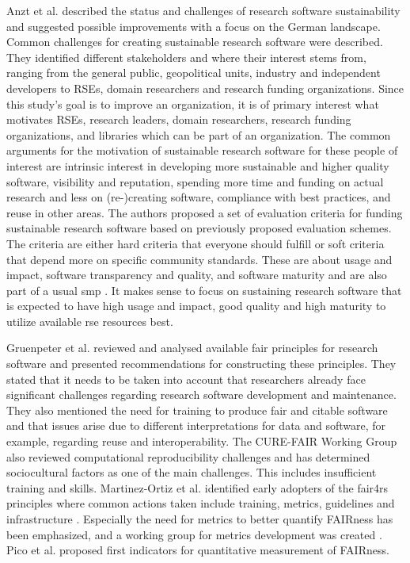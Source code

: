 Anzt et al. \cite{anzt_environment_2021} described the status and challenges of research software sustainability and suggested possible improvements with a focus on the German landscape. Common challenges for creating sustainable research software were described. 
They identified different stakeholders and where their interest stems from, ranging from the general public, geopolitical units, industry and independent developers to RSEs, domain researchers and research funding organizations. Since this study's goal is to improve an organization, it is of primary interest what motivates RSEs, research leaders, domain researchers, research funding organizations, and libraries which can be part of an organization. The common arguments for the motivation of sustainable research software for these people of interest are intrinsic interest in developing more sustainable and higher quality software, visibility and reputation, spending more time and funding on actual research and less on (re-)creating software, compliance with best practices, and reuse in other areas. The authors proposed a set of evaluation criteria for funding sustainable research software based on previously proposed evaluation schemes. The criteria are either hard criteria that everyone should fulfill or soft criteria that depend more on specific community standards. These are about usage and impact, software transparency and quality, and software maturity and are also part of a usual \acrfull{smp} \cite{noauthor_software_nodate}. It makes sense to focus on sustaining research software that is expected to have high usage and impact, good quality and high maturity to utilize available \acrshort{rse} resources best.


Gruenpeter et al. \cite{gruenpeter_morane_m215_2020} reviewed and analysed available \acrshort{fair} principles for research software and presented recommendations for constructing these principles. They stated that it needs to be taken into account that researchers already face significant challenges regarding research software development and maintenance. They also mentioned the need for training to produce \acrshort{fair} and citable software and that issues arise due to different interpretations for data and software, for example, regarding reuse and interoperability. 
The CURE-FAIR Working Group \cite{peer_challenges_2021} also reviewed computational reproducibility challenges and has determined sociocultural factors as one of the main challenges. This includes insufficient training and skills. Martinez-Ortiz et al. \cite{martinez-ortiz_fair4rs_2022} identified early adopters of the \acrshort{fair4rs} principles where common actions taken include training, metrics, guidelines and infrastructure \cite{martinez_survey_2022}. Especially the need for metrics to better quantify FAIRness has been emphasized, and a working group for metrics development was created \cite{barker_fair4rs_2022, noauthor_fair4rs_nodate, fair4rsmetricswg}. Pico et al. \cite{pico_fairsoft_2022} proposed first indicators for quantitative measurement of FAIRness.


